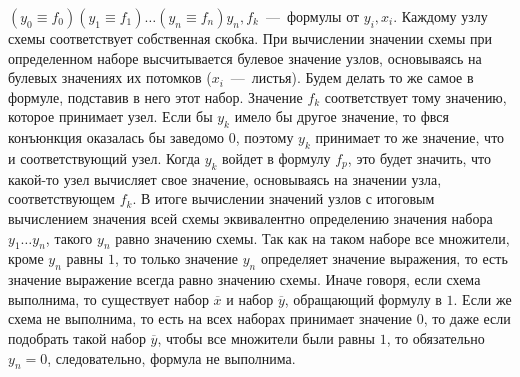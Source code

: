 \documentclass[a4paper,12pt]{article} %
\begin{document}
$(y_0\equiv f_0)(y_1\equiv f_1)\ldots(y_n\equiv f_n)y_n, f_k$~---~формулы от $y_i, x_i$. Каждому узлу схемы соответствует собственная скобка. При вычислении значении схемы при определенном наборе высчитывается булевое значение узлов, основываясь на булевых значениях их потомков ($x_i$~---~листья). Будем делать то же самое в формуле, подставив в него этот набор. Значение $f_k$ соответствует тому значению, которое принимает узел. Если бы $y_k$ имело бы другое значение, то фвся конъюнкция оказалась бы заведомо $0$, поэтому $y_k$ принимает то же значение, что и соответствующий узел. Когда $y_k$ войдет в формулу $f_p$, это будет значить, что какой-то узел вычисляет свое значение, основываясь на значении узла, соответствующем $f_k$. В итоге вычислении значений узлов с итоговым вычислением значения всей схемы эквивалентно определению значения набора $y_1\ldots y_n$, такого $y_n$ равно значению схемы. Так как на таком наборе все множители, кроме $y_n$ равны $1$, то только значение $y_n$ определяет значение выражения, то есть значение выражение всегда равно значению схемы. Иначе говоря, если схема выполнима, то существует набор $\overline x$ и набор $\overline y$, обращающий формулу в $1$. Если же схема не выполнима, то есть на всех наборах принимает значение $0$, то даже если подобрать такой набор $\overline y$, чтобы все множители были равны $1$, то обязательно $y_n=0$, следовательно, формула не выполнима.
\end{document}
